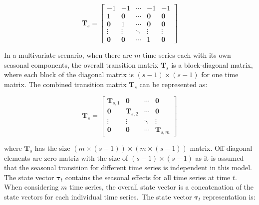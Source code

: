     \begin{equation}
        \mathbf{T}_s=
            \left[
                \begin{array}{ccccc}
                    -1             & -1         & \cdots &  -1        & -1 \\
                    1              & \mathbf{0} & \cdots & \mathbf{0} & \mathbf{0} \\
                    \mathbf{0}     & 1          & \cdots & \mathbf{0} & \mathbf{0} \\
                    \vdots         & \vdots     & \ddots & \vdots     & \vdots \\
                    \mathbf{0}     & \mathbf{0} & \cdots & 1          & \mathbf{0}
                \end{array}
            \right]
    \label{eq:seasonal_transition_uni}
    \end{equation}

    In a multivariate scenario, when there are $m$ time series each with its own seasonal components,
    the overall transition matrix $\mathbf{T}_s$ is a block-diagonal matrix, where each block of the diagonal matrix
    is $(s-1) \times (s-1)$ for one time matrix.
    The combined transition matrix $\mathbf{T}_{s}$ can be represented as:

    \begin{equation}
        \mathbf{T}_s=
            \left[
                \begin{array}{cccc}
                    \mathbf{T}_{s, 1} & \mathbf{0}        & \cdots & \mathbf{0} \\
                    \mathbf{0}        & \mathbf{T}_{s, 2} & \cdots & \mathbf{0} \\
                    \vdots            & \vdots            & \ddots & \vdots     \\
                    \mathbf{0}        & \mathbf{0}        & \cdots & \mathbf{T}_{s, m}
                \end{array}
            \right]
        \label{eq:seasonal_transition_mv}
    \end{equation}

    where $\mathbf{T}_{s}$ has the size $(m \times (s-1)) \times (m \times (s-1))$ matrix.
    Off-diagonal elements are zero matriz with the size of $(s-1) \times (s-1)$ as it is assumed that the seasonal transition
    for different time series is independent in this model.
    The state vector $\bm{\tau}_t$ contains the seasonal effects for all time series at time $t$.
    When considering $m$ time series, the overall state vector is a concatenation of the state vectors for each
    individual time series.\ The state vector $\bm{\tau}_t$ representation is:

